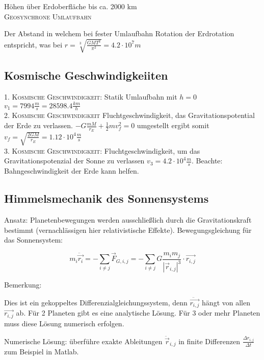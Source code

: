 \documentclass[a4paper,12pt]{report}
\begin{document}
Höhen über Erdoberfläche bis ca. 2000 km \\

\textsc{Geosynchrone Umlaufbahn}

Der Abstand in welchem bei fester Umlaufbahn Rotation der Erdrotation entspricht, was bei 
$r =  \sqrt[3]{\frac{GMT^2}{\pi^2}} = 4.2 \cdot 10^7 m $ \\


\subsection{Kosmische Geschwindigkeiiten}

\textsc{1. Kosmische Geschwindigkeit:} Statik Umlaufbahn mit $h=0$ \quad $v_1 = 7994 \frac{m}{s} = 28598.4 \frac{km}{h} $\\

\textsc{2. Kosmische Geschwindigkeit}  Fluchtgeschwindigkeit, das Gravitationspotential der Erde zu verlassen. $-G \frac{mM}{r_E} + \frac{1}{2} m v_f^2 = 0 $ umgestellt ergibt somit $ v_f = \sqrt{\frac{2GM}{r_E} } = 1.12 \cdot 10^4 \frac{m}{s} $ \\

\textsc{3. Kosmische Geschwindigkeit:} Fluchtgeschwindigkeit, um das Gravitationspotenzial der Sonne zu verlassen $ v_3 = 4.2 \cdot 10^4 \frac{m}{s} $. Beachte: Bahngeschwindigkeit der Erde kann helfen. \\


\subsection{Himmelsmechanik des Sonnensystems}

Ansatz: Planetenbewegungen werden ausschließlich durch die Gravitationskraft bestimmt (vernachlässigen hier relativistische Effekte). Bewegungsgleichung für das Sonnensystem:

\begin{equation}
m_i \ddot{\vec{r_i}} = - \sum_{i \neq j} \vec{F}_{G,i,j} =  - \sum_{i \neq j} G \frac{m_i m_j}{|\vec{r}_{i,j}|^3} \cdot \vec{r_{i,j}} 
\end{equation}

Bemerkung:

Dies ist ein gekoppeltes Differenzialgleichungssystem, denn $ \ddot{\vec{r_{i,j}}}$ hängt von allen $ \vec{r_{i,j}}$  ab. Für 2 Planeten gibt es eine analytische Lösung. Für 3 oder mehr Planeten muss diese Lösung numerisch erfolgen.

Numerische Lösung: überführe exakte Ableitungen  $ \ddot{\vec{r}}_{i,j}$ in finite Differenzen  $ \frac{\Delta r_{i,j}}{\Delta t} $ zum Beispiel in Matlab.
\end{document}
